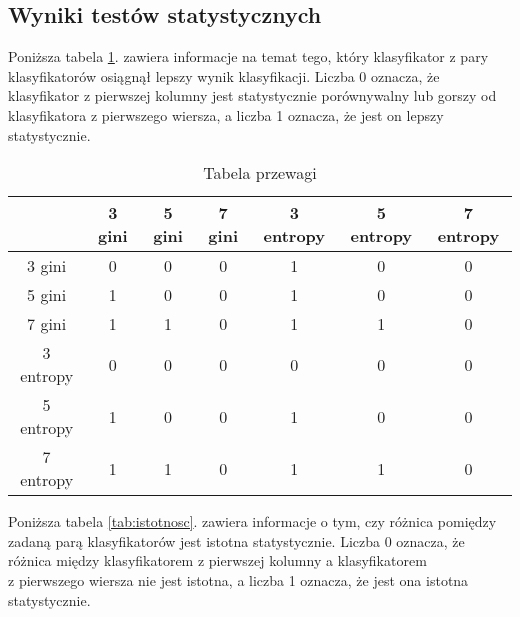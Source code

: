 \documentclass{article}
\begin{document}
\newpage

\subsection{Wyniki testów statystycznych}

\quad Poniższa tabela \ref{tab:przewaga}. zawiera informacje na temat tego, który klasyfikator z pary klasyfikatorów osiągnął lepszy wynik klasyfikacji. Liczba 0 oznacza, że klasyfikator z pierwszej kolumny jest statystycznie porównywalny lub gorszy od klasyfikatora z pierwszego wiersza, a liczba 1 oznacza, że jest on lepszy statystycznie.

\begin{center}
\begin{longtable}{c|c|c|c|c|c|c|}
\caption{Tabela przewagi}
		\label{tab:przewaga}\\
\cline{2-7}
                                & 3 gini & 5 gini & 7 gini & 3 entropy & 5 entropy & 7 entropy \\ \hline
\multicolumn{1}{|c|}{3 gini}    & 0      & 0       & 0       & 1          &  0         &  0         \\ \hline
\multicolumn{1}{|c|}{5 gini}    & 1       & 0      &  0      & 1          &  0         & 0          \\ \hline
\multicolumn{1}{|c|}{7 gini}    & 1       & 1       & 0      & 1          & 1          & 0          \\ \hline
\multicolumn{1}{|c|}{3 entropy} & 0       & 0       & 0       & 0         & 0          & 0          \\ \hline
\multicolumn{1}{|c|}{5 entropy} & 1       & 0       & 0       & 1          & 0         & 0          \\ \hline
\multicolumn{1}{|c|}{7 entropy} & 1       & 1       & 0       & 1          &  1         & 0         \\ \hline
\end{longtable}
\end{center}

Poniższa tabela \ref{tab:istotnosc}. zawiera informacje o tym, czy różnica pomiędzy zadaną parą klasyfikatorów jest istotna statystycznie. Liczba 0 oznacza, że różnica między klasyfikatorem z pierwszej kolumny a klasyfikatorem\\ z pierwszego wiersza nie jest istotna, a liczba 1 oznacza, że jest ona istotna statystycznie.
\end{document}
